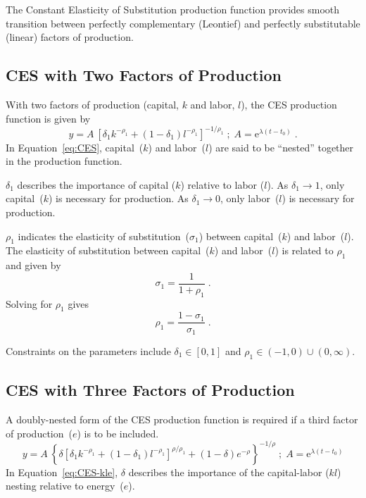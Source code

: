 \documentclass[preprint,authoryear,12pt]{elsarticle}
\begin{document}
The Constant Elasticity of Substitution production function
provides smooth transition between perfectly complementary (Leontief) 
and perfectly substitutable (linear) factors of production.


\subsection{CES with Two Factors of Production} 
\label{sec:CES-2}

With two factors of production (capital, $k$ and labor, $l$), 
the CES production function is given by
%
\begin{equation} \label{eq:CES}
  y = A \: \left[\delta_1 k^{-\rho_1} 
      + (1-\delta_1)l^{-\rho_1} \right]^{-1/\rho_1} \; ; \;
      A = \mathrm{e}^{\lambda (t-t_0)}   \; .
\end{equation}
%
In Equation~\ref{eq:CES}, capital~($k$) and labor~($l$) are said to be ``nested''
together in the production function.

$\delta_1$ describes the importance of capital ($k$)
relative to labor ($l$).
As $\delta_1 \rightarrow 1$, only capital~($k$) is necessary for production.
As $\delta_1 \rightarrow 0$, only labor~($l$) is necessary for production.

$\rho_1$ indicates the elasticity 
of substitution~($\sigma_1$) between capital~($k$) and labor~($l$).
The elasticity of substitution 
between capital~($k$) and labor~($l$) is related to $\rho_1$ and given by 
%
\begin{equation} \label{eq:sigma_1}
 \sigma_1 = \frac{1}{1+\rho_1} \; .
\end{equation}
%
Solving for $\rho_1$ gives
%
\begin{equation} \label{eq:rho_1}
  \rho_1 = \frac{1 - \sigma_1}{\sigma_1} \; .
\end{equation}

Constraints on the parameters include 
$\delta_1 \in [0,1]$ and
$\rho_1 \in (-1,0) \cup (0,\infty)$.



\subsection{CES with Three Factors of Production} 
\label{sec:CES-3}

A doubly-nested form of the CES production function is required
if a third factor of production~($e$) is to be included.
%
\begin{equation} \label{eq:CES-kle}
  y = A \: \left\{\delta \left[\delta_1 k^{-\rho_1} 
      + (1-\delta_1)l^{-\rho_1} \right]^{\rho/\rho_1} 
      + (1-\delta) e^{-\rho} \right\}^{-1/\rho} \; ; \; 
      A = \mathrm{e}^{\lambda (t-t_0)}
\end{equation}
%
In Equation~\ref{eq:CES-kle}, $\delta$ 
describes the importance of the capital-labor ($kl$) nesting 
relative to energy~($e$).
\end{document}
